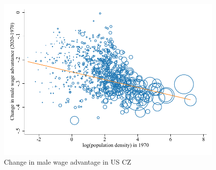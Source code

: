 \begin{figure}[!h]
\centering
\caption{Change in male wage advantage in US CZ}
\includegraphics[width=.75\textwidth]{../2_analysis/output/figures/change_in_gap}
\end{figure}
